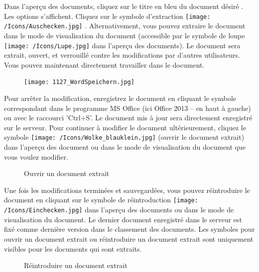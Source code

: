 Dans l'aperçu des documents, cliquez sur le titre en bleu du document désiré . Les options s'affichent. Cliquez sur le symbole d'extraction \texttt{[image: /Icons/Auschecken.jpg]} . Alternativement, vous pouvez extraire le document dans le mode de visualisation du document (accessible par le symbole de loupe \texttt{[image: /Icons/Lupe.jpg]}  dans l'aperçu des documents). Le document sera extrait, ouvert, et verrouillé contre les modifications par d'autres utilisateurs. Vous pouvez maintenant directement travailler dans le document.

\begin{figure}
\vspace{-15pt}
\texttt{[image: 1127\_WordSpeichern.jpg]}
\end{figure}
Pour arrêter la modification, enregistrez le document en cliquant le symbole correspondant dans le programme MS Office  (ici Office 2013 -- en haut à gauche) ou avec le raccourci 'Ctrl+S'. Le document mis à jour sera directement enregistré sur le serveur. Pour continuer à modifier le document ultérieurement, cliquez le symbole \texttt{[image: /Icons/Wolke\_blauklein.jpg]}  (ouvrir le document extrait) dans l'aperçu des document ou dans le mode de visualisation du document que vous voulez modifier.

\begin{figure}[H]
\caption{Ouvrir un document extrait}
\end{figure}

Une fois les modifications terminées et sauvegardées, vous pouvez réintroduire le document 
en cliquant sur le symbole de réintroduction \texttt{[image: /Icons/Einchecken.jpg]}  dans l'aperçu des documents ou dans le mode de visualisation du document. Le dernier document enregistré dans le serveur est fixé comme dernière version dans le classement des documents. Les symboles pour ouvrir un document extrait ou réintroduire un document extrait sont uniquement visibles pour les documents qui sont extraits.

\begin{figure}[H]
\caption{Réintroduire un document extrait}
\end{figure}

